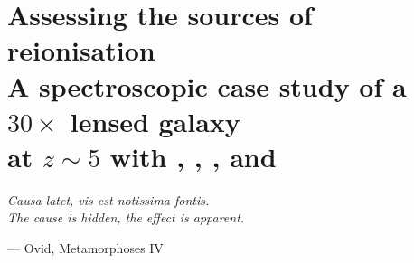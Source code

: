 \chapter[Assessing the sources of reionisation]{Assessing the sources of reionisation \\[2ex]\large{A spectroscopic case study of a \texorpdfstring{$30\times$}{30x} lensed galaxy\\[-1ex]at \texorpdfstring{$z \sim 5$}{z~5} with \texorpdfstring{\lya, \CIV, \MgII, and \NeIII}{\lyatext, CIV, MgII, and [NeIII]}}}
\label{ch:Assessing_the_sources_of_reionisation}

\ifsetDraft
\else
    \renewcommand{\CurrentTitleColor}{\color{black}}
    
    \vspace*{\fill}
    \setlength{\epigraphwidth}{0.5\textwidth}
    \epigraph{\textit{Causa latet, vis est notissima fontis.}
        \\
        \vspace{2ex}
        \textit{The cause is hidden, the effect is apparent.}}{--- Ovid, Metamorphoses IV}
    \vspace*{\fill}
    
    
